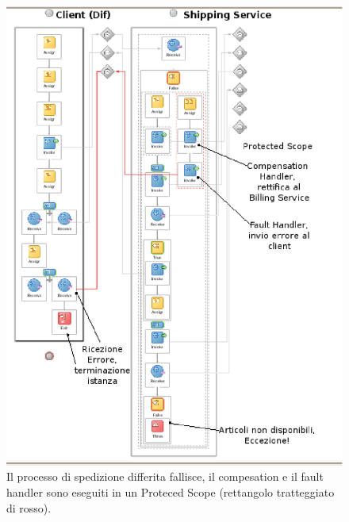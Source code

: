 \begin{figure}[p]
\begin{center}
  \includegraphics[scale=0.90,clip]{blide/dia/Sim4}
   \caption[Blide, simulazione 4]{Il processo di spedizione differita fallisce,
   il compesation e il fault handler sono eseguiti in un Proteced Scope
   (rettangolo tratteggiato di rosso).}
  \label{fig:Sim4}
\end{center}
\end{figure}


